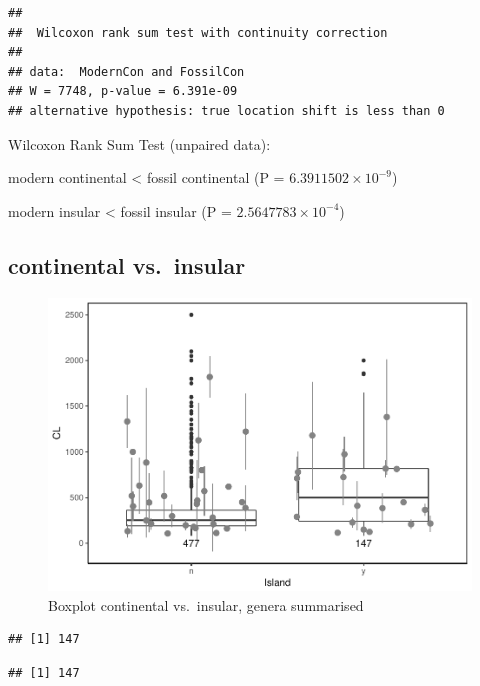 \documentclass[]{article}
\begin{document}
\begin{verbatim}
## 
##  Wilcoxon rank sum test with continuity correction
## 
## data:  ModernCon and FossilCon
## W = 7748, p-value = 6.391e-09
## alternative hypothesis: true location shift is less than 0
\end{verbatim}

Wilcoxon Rank Sum Test (unpaired data):

modern continental \textless{} fossil continental (P =
\(6.3911502\times 10^{-9}\))

modern insular \textless{} fossil insular (P =
\(2.5647783\times 10^{-4}\))

\newpage

\subsection{continental vs.~insular}\label{continental-vs.insular-1}

\begin{figure}[htbp]
\centering
\includegraphics{MA_JJ_files/figure-latex/BPCI-1.pdf}
\caption{Boxplot continental vs.~insular, genera summarised}
\end{figure}

\begin{verbatim}
## [1] 147
\end{verbatim}

\begin{verbatim}
## [1] 147
\end{verbatim}
\end{document}
